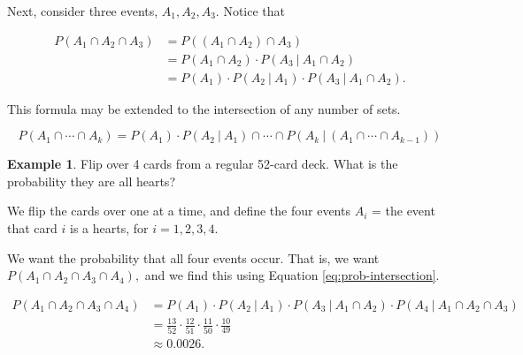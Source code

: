 \documentclass[
]{book}
\theoremstyle{definition}
\theoremstyle{definition}
\newtheorem{example}{Example}[chapter]
\theoremstyle{definition}
\theoremstyle{definition}
\theoremstyle{remark}
\begin{document}
Next, consider three events, \(A_1, A_2, A_3\). Notice that

\begin{align*}
P(A_1 \cap A_2 \cap A_3) &= P((A_1\cap A_2) \cap A_3) \\
                         &= P(A_1 \cap A_2) \cdot P(A_3~|~A_1 \cap A_2)\\
                         &= P(A_1) \cdot P(A_2~|~A_1) \cdot P(A_3~|~A_1 \cap A_2).
\end{align*}

This formula may be extended to the intersection of any number of sets.

\begin{equation} 
  P(A_1 \cap \cdots \cap A_k) = P(A_1) \cdot P(A_2 ~|~ A_1) \cap  \cdots \cap P(A_k ~|~ (A_1 \cap \cdots \cap A_{k-1}))
  \label{eq:prob-intersection}
\end{equation}

\begin{example}
\protect\hypertarget{exm:all-hearts}{}\label{exm:all-hearts}Flip over 4 cards from a regular 52-card deck. What is the probability they are all hearts?

We flip the cards over one at a time, and define the four events \(A_i\) = the event that card \(i\) is a hearts, for \(i = 1, 2, 3, 4\).

We want the probability that all four events occur. That is, we want \(P(A_1 \cap A_2 \cap A_3 \cap A_4),\) and we find this using Equation \eqref{eq:prob-intersection}.

\begin{align*}
P(A_1 \cap A_2 \cap A_3 \cap A_4) &= P(A_1) \cdot P(A_2 ~|~ A_1) \cdot P(A_3 ~|~ A_1 \cap A_2) \cdot P(A_4 ~|~ A_1 \cap A_2 \cap A_{3})\\
&= \frac{13}{52} \cdot \frac{12}{51} \cdot \frac{11}{50} \cdot \frac{10}{49} \\
&\approx 0.0026.
\end{align*}
\end{example}
\end{document}
